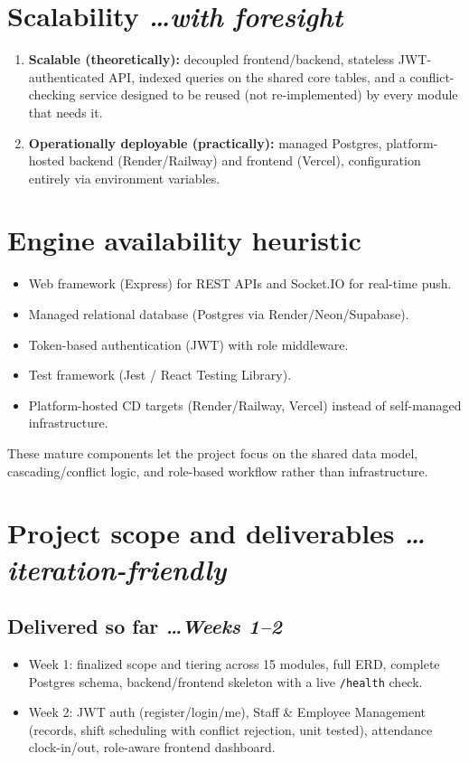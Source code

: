 \documentclass[11pt,a4paper]{article}
\newcommand{\BvrHint}[1]{%
  {\normalfont\normalsize\itshape\hfill #1}}
\begin{document}
\section{Scalability %
\BvrHint{\ldots with foresight}}
\begin{enumerate}[leftmargin=0.7cm]
    \item \textbf{Scalable (theoretically):} decoupled frontend/backend,
      stateless JWT-authenticated API, indexed queries on the shared
      core tables, and a conflict-checking service designed to be
      reused (not re-implemented) by every module that needs it.
    \item \textbf{Operationally deployable (practically):} managed
      Postgres, platform-hosted backend (Render/Railway) and frontend
      (Vercel), configuration entirely via environment variables.
\end{enumerate}

\section{Engine availability heuristic}
\begin{itemize}[leftmargin=0.7cm]
    \item Web framework (Express) for REST APIs and Socket.IO for
      real-time push.
    \item Managed relational database (Postgres via
      Render/Neon/Supabase).
    \item Token-based authentication (JWT) with role middleware.
    \item Test framework (Jest / React Testing Library).
    \item Platform-hosted CD targets (Render/Railway, Vercel) instead
      of self-managed infrastructure.
\end{itemize}
These mature components let the project focus on the shared data
model, cascading/conflict logic, and role-based workflow rather than
infrastructure.

\section{Project scope and deliverables %
\BvrHint{\ldots iteration-friendly}}
\subsection{Delivered so far %
\BvrHint{\ldots Weeks 1--2}}
\begin{itemize}[leftmargin=0.7cm]
    \item Week 1: finalized scope and tiering across 15 modules, full
      ERD, complete Postgres schema, backend/frontend skeleton with a
      live \texttt{/health} check.
    \item Week 2: JWT auth (register/login/me), Staff \& Employee
      Management (records, shift scheduling with conflict rejection,
      unit tested), attendance clock-in/out, role-aware frontend
      dashboard.
\end{itemize}
\end{document}
